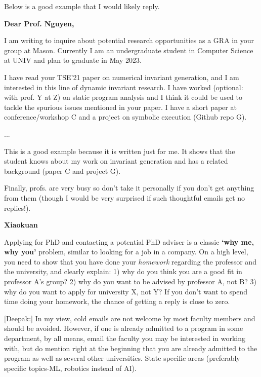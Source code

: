 \documentclass[oneside,11pt,dvipsnames]{book}
\newenvironment{commentbox}[1][]{
  \small
  \begin{mybox}
    {\small \textbf{#1}}
  }{
  \end{mybox}
}
\begin{document}
Below is a good example that I would likely reply.

\begin{commentbox}[Dear Prof. Nguyen,]

  I am writing to inquire about potential research opportunities as a GRA in your group at Mason. Currently I am an undergraduate student in Computer Science at UNIV and plan to graduate in May 2023.


  I have read your TSE'21 paper on numerical invariant generation, and I am interested in this line of dynamic invariant research. I have worked (optional: with prof. Y at Z) on static program analysis and I think it could be used to tackle the spurious issues mentioned in your paper. I have a short paper at conference/workshop C and a project on symbolic execution (Github repo G).

  ...

  This is a good example because it is written just for me.  It shows that the student knows about my work on invariant generation and has a related background (paper C and project G).
\end{commentbox}

Finally, profs. are very busy so don't take it personally if you don't get anything from them (though I would be very surprised if such thoughtful emails get no replies!).


\begin{commentbox}[Xiaokuan]
  Applying for PhD and contacting a potential PhD adviser is a classic \textbf{`why me, why you'} problem,
  similar to looking for a job in a company.
  On a high level,
  you need to show that you have done your \emph{homework}
  regarding the professor and the university,
  and clearly explain:
  1) why do you think you are a good fit in professor A's group?
  2) why do you want to be advised by professor A, not B?
  3) why do you want to apply for university X, not Y?
  If you don't want to spend time doing your homework,
  the chance of getting a reply is close to zero.
\end{commentbox}


\begin{commentbox}
  [Deepak:]
  In my view, cold emails are not welcome by most faculty members and should be avoided. However, if one is already admitted to a program in some department, by all means, email the faculty you may be interested in working with, but do mention right at the beginning that you are already admitted to the program as well as several other universities. State specific areas (preferably specific topics-ML, robotics instead of AI).
\end{commentbox}
\end{document}
